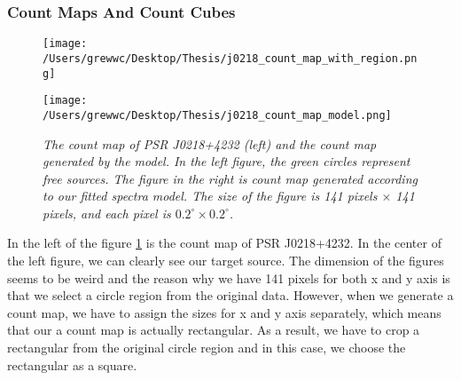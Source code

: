 \documentclass[12pt]{report}
\newcommand{\mycaption}[1]{\caption{\textit{\footnotesize #1}}}
\begin{document}
          \subsubsection{Count Maps And Count Cubes}
          \begin{figure}[!ht]  
            \begin{center}
            \begin{minipage}{0.45\textwidth}
              \begin{center} 
                  \texttt{[image: /Users/grewwc/Desktop/Thesis/j0218\_count\_map\_with\_region.png]}
              \end{center}
            \end{minipage}
            \begin{minipage}{0.45\textwidth}
              \begin{center} 
                  \texttt{[image: /Users/grewwc/Desktop/Thesis/j0218\_count\_map\_model.png]}
              \end{center}
            \end{minipage}
          \end{center}
            \begin{minipage}{\textwidth}
              \centering 
              \mycaption{The count map of PSR J0218+4232 (left) and the count map generated by the model. In the left figure,
              the green circles represent free sources. The figure in the right is count map generated 
              according to our fitted spectra model. 
              The size of the figure is 141 pixels $\times$ 141 pixels, and each pixel is $0.2^\circ \times 0.2^\circ$. }
            \label{fig: j0218_count_map_and_model}    
            \end{minipage}
          \end{figure}
          In the left of the figure \ref{fig: j0218_count_map_and_model} 
          is the count map of PSR J0218+4232.
          In the center of the left figure, 
          we can clearly see our target source. The dimension of the figures seems to be weird and 
          the reason why we have 141 pixels for both x and y axis is that we select a circle region from 
          the original data. However, when we generate a count map, we have to assign the sizes for x and y 
          axis separately, which means that our a count map is actually rectangular. As a result, we have to crop a 
          rectangular from the original circle region and in this case, we choose the rectangular as a square.  
          
\end{document}
